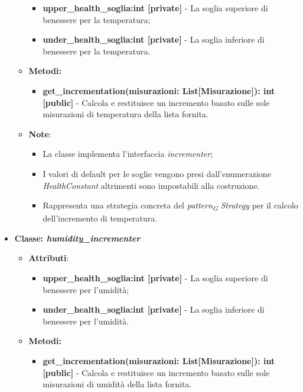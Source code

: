 \begin{itemize}
\begin{itemize}
        \begin{itemize}
        \item \textbf{upper\_health\_soglia:int [private]} - La soglia superiore di benessere per la temperatura;
        \item \textbf{under\_health\_soglia:int [private]} - La soglia inferiore di benessere per la temperatura.
    \end{itemize}
    \item \textbf{Metodi: }
    \begin{itemize}
        \item \textbf{get\_incrementation(misurazioni: List[Misurazione]): int [public]} - Calcola e restituisce un incremento basato sulle sole misurazioni di temperatura della lista fornita.
    \end{itemize}
    \item\textbf{Note}:
        \begin{itemize}
            \item La classe implementa l'interfaccia \textit{incrementer};
            \item I valori di default per le soglie vengono presi dall'enumerazione \textit{HealthConstant} altrimenti sono impostabili alla costruzione.
            \item Rappresenta una strategia concreta del \textit{pattern}\textsubscript{\textit{G}} \textit{Strategy} per il calcolo dell'incremento di temperatura.
        \end{itemize}
    \end{itemize}
    \item{\textbf{Classe: \textit{humidity\_incrementer}}}
    \begin{itemize}
    \item\textbf{Attributi}:
        \begin{itemize}
        \item \textbf{upper\_health\_soglia:int [private]} - La soglia superiore di benessere per l'umidità;
        \item \textbf{under\_health\_soglia:int [private]} - La soglia inferiore di benessere per l'umidità.
    \end{itemize}
    \item \textbf{Metodi: }
    \begin{itemize}
        \item \textbf{get\_incrementation(misurazioni: List[Misurazione]): int [public]} - Calcola e restituisce un incremento basato sulle sole misurazioni di umidità della lista fornita.

\end{itemize}
\end{itemize}
\end{itemize}
